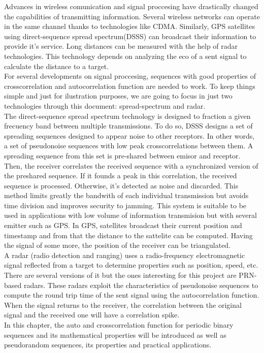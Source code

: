Advances in wireless comunication and signal proccesing have drastically
changed the capabilities of transmitting information. Several wireless
networks can operate in the same channel thanks to technologies like
CDMA. Similarly, GPS\cite{GPS} satellites using direct-sequence spread
spectrum(DSSS) can broadcast their information to provide it's service. Long
distances can be measured with the help of radar technologies. This
technology depends on analyzing the eco of a sent signal to calculate the
distance to a target.\\

For several developments on signal proccesing, sequences with good properties
of crosscorrelation and autocorrelation function are needed to work. To keep
things simple and just for ilustration purposes, we are going to focus in just
two technologies through this document: spread-spectrum and radar.\\

The direct-sequence spread spectrum technology\cite{DSSS_1}\cite{DSSS} is
designed to fraction a given frecuency band between multiple transmissions. To
do so, DSSS designs a set of spreading sequences designed to appear noise to
other receptors. In other words, a set of pseudonoise sequences with low peak
crosscorrelations between them. A spreading sequence from this set is pre-shared
between emisor and receptor. Then, the receiver correlates the received
sequence with a synchronized version of the preshared sequence. If it founds a
peak in this correlation, the received sequence is processed. Otherwise, it's
detected as noise and discarded. This method limits greatly the bandwith of
each individual transmission but avoids time division and improves security to
jamming. This system is suitable to be used in applications with low volume
of information transmision but with several emitter such as GPS. In GPS,
satellites broadcast their current position and timestamp and from that
the distance to the sattelite can be computed. Having the signal of some more,
the position of the receiver can be triangulated.\\

A radar (radio detection and ranging) uses a radio-frequency electromagnetic
signal reflected from a target to determine properties such as position, speed,
etc. There are several versions of it but the ones interesting for this
project are PRN-based radars\cite{prn_radar_example1}\cite{prn_radar_example2}.
These radars exploit the characteristics of pseudonoise sequences to compute the
round trip time of the sent signal using the autocorrelation function. When
the signal returns to the receiver, the correlation between the original
signal and the received one will have a correlation spike.\\

In this chapter, the auto and crosscorrelation function for
periodic binary sequences and its mathematical properties will be introduced
as well as pseudorandom sequences, its properties and practical applications.

 
